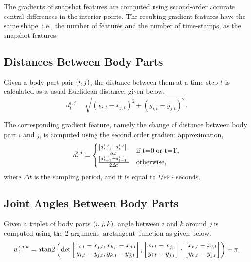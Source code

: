 The gradients of snapshot features are computed using second-order accurate central differences in the interior points.
The resulting gradient features have the same shape, i.e., the number of features and the number of time-stamps, as the snapshot features.

\subsection{Distances Between Body Parts}
Given a body part pair $\left(i,j\right)$, the distance between them at a time step $t$ is calculated as a usual Euclidean distance, given below.
\begin{equation}
	d^{i,j}_t = \sqrt{(x_{i,t} - x_{j,t})^2 + (y_{i,t} - y_{j,t})^2}.
\end{equation}

The corresponding gradient feature, namely the change of distance between body part $i$ and $j$, is computed using the second order gradient approximation,
\begin{equation}
	\dot{d}^{i,j}_t = \begin{cases} \frac{\abs{d^{i,j}_{t+1} - d^{i,j}_{t}}}{\Delta t} & \textnormal{if } $t=0$ \textnormal{ or } $t=T$, \\ \frac{\abs{d^{i,j}_{t+1} - d^{i,j}_{t-1}}}{2\Delta t} & \textnormal{otherwise}, \end{cases}
\end{equation}
where $\Delta t$ is the sampling period, and it is equal to $\sfrac{1}{\textnormal{FPS}}$ seconds.

\subsection{Joint Angles Between Body Parts}
Given a triplet of body parts $\left(i,j,k\right)$, angle between $i$ and $k$ around $j$ is computed using the 2-argument $\operatorname{arctangent}$ function as given below.
\begin{equation}
	w^{i,j,k}_t = \mathop{\rm{atan2}} \left(\det \begin{bmatrix} x_{i,t} - x_{j,t}, x_{k,t} - x_{j,t} \\ y_{i,t} - y_{j,t}, y_{k,t} - y_{j,t} \end{bmatrix}, \begin{bmatrix} x_{i,t} - x_{j,t} \\ y_{i,t} - y_{j,t} \end{bmatrix} \cdot \begin{bmatrix} x_{k,t} - x_{j,t}  \\ y_{k,t} - y_{j,t} \end{bmatrix}\right) + \pi.
\end{equation}

